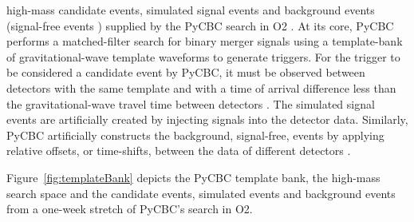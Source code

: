 \documentclass[%
 reprint,
 amsmath,amssymb,
 aps,
]{revtex4}
\newcommand{\pycbc}{{\sc PyCBC}\xspace}
\begin{document}

 
 

high-mass candidate events, simulated signal events and  background events (signal-free events ) supplied by the \pycbc \cite{pycbc_code} search in O2  \cite{pycbc_og0, pycbc_og1, pycbc_og2, pycbc_og3, pycbc_og4, pycbc_og5}.  At its core, \pycbc performs a matched-filter search for binary merger signals using a template-bank of gravitational-wave template waveforms to generate triggers. For the trigger to be considered a  candidate event by \pycbc, it must be observed between detectors with the same template and with a time of arrival difference less than the gravitational-wave travel time between detectors \cite{pycbc_og0}. The simulated signal events are artificially created by injecting signals into the detector data. Similarly, \pycbc artificially constructs the background, signal-free, events by applying relative offsets, or time-shifts, between the data of different detectors \cite{pycbc_og0}. 


Figure~\ref{fig:templateBank} depicts the \pycbc template bank, the high-mass search space and the candidate events, simulated events and background events from a one-week stretch of \pycbc's search in O2. 
\end{document}
